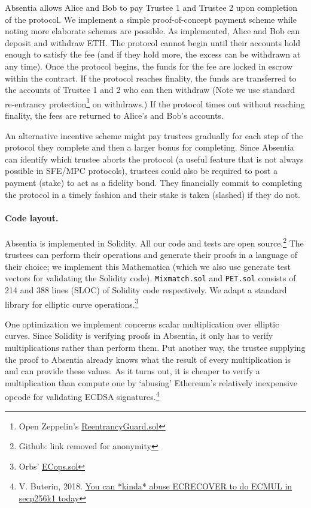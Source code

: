 Absentia allows Alice and Bob to pay Trustee 1 and Trustee 2 upon completion of the protocol. We implement a simple proof-of-concept payment scheme while noting more elaborate schemes are possible. As implemented, Alice and Bob can deposit and withdraw ETH. The protocol cannot begin until their accounts hold enough to satisfy the fee (and if they hold more, the excess can be withdrawn at any time). Once the protocol begins, the funds for the fee are locked in escrow within the contract. If the protocol reaches finality, the funds are transferred to the accounts of Trustee 1 and 2 who can then withdraw (Note we use standard re-entrancy protection\footnote{Open Zeppelin's \href{https://github.com/OpenZeppelin/openzeppelin-contracts/blob/master/contracts/utils/ReentrancyGuard.sol}{ReentrancyGuard.sol}} on withdraws.) If the protocol times out without reaching finality, the fees are returned to Alice's and Bob's accounts. 

An alternative incentive scheme might pay trustees gradually for each step of the protocol they complete and then a larger bonus for completing. Since Absentia can identify which trustee aborts the protocol (a useful feature that is not always possible in SFE/MPC protocols), trustees could also be required to post a payment (stake) to act as a fidelity bond. They financially commit to completing the protocol in a timely fashion and their stake is taken (slashed) if they do not.


\paragraph{Code layout.} 

Absentia is implemented in Solidity. All our code and tests are open source.\footnote{Github: link removed for anonymity} The trustees can perform their operations and generate their proofs in a language of their choice; we implement this Mathematica (which we also use generate test vectors for validating the Solidity code). \texttt{Mixmatch.sol} and \texttt{PET.sol} consists of 214 and 388 lines (SLOC) of Solidity code respectively. We adapt a standard library for elliptic curve operations.\footnote{Orbs' \href{https://github.com/orbs-network/elliptic-curve-solidity/blob/master/ECops.sol}{ECops.sol}}

One optimization we implement concerns scalar multiplication over elliptic curves. Since Solidity is verifying proofs in Absentia, it only has to verify multiplications rather than perform them. Put another way, the trustee supplying the proof to Absentia already knows what the result of every multiplication is and can provide these values. As it turns out, it is cheaper to verify a multiplication than compute one by `abusing' Ethereum's relatively inexpensive opcode for validating ECDSA signatures.\footnote{V. Buterin, 2018. \href{https://ethresear.ch/t/you-can-kinda-abuse-ecrecover-to-do-ecmul-in-secp256k1-today/2384}{You can *kinda* abuse ECRECOVER to do ECMUL in secp256k1 today}}


